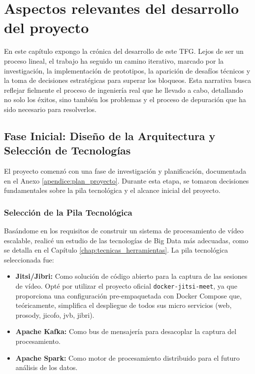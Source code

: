 \chapter{Aspectos relevantes del desarrollo del proyecto}
\label{chap:desarrollo}

En este capítulo expongo la crónica del desarrollo de este TFG. Lejos de ser un proceso lineal, el trabajo ha seguido un camino iterativo, marcado por la investigación, la implementación de prototipos, la aparición de desafíos técnicos y la toma de decisiones estratégicas para superar los bloqueos. Esta narrativa busca reflejar fielmente el proceso de ingeniería real que he llevado a cabo, detallando no solo los éxitos, sino también los problemas y el proceso de depuración que ha sido necesario para resolverlos.

\section{Fase Inicial: Diseño de la Arquitectura y Selección de Tecnologías}
El proyecto comenzó con una fase de investigación y planificación, documentada en el Anexo \ref{apendice:plan_proyecto}. Durante esta etapa, se tomaron decisiones fundamentales sobre la pila tecnológica y el alcance inicial del proyecto.

\subsection{Selección de la Pila Tecnológica}
Basándome en los requisitos de construir un sistema de procesamiento de vídeo escalable, realicé un estudio de las tecnologías de Big Data más adecuadas, como se detalla en el Capítulo \ref{chap:tecnicas_herramientas}. La pila tecnológica seleccionada fue:
\begin{itemize}
    \item \textbf{Jitsi/Jibri:} Como solución de código abierto para la captura de las sesiones de vídeo. Opté por utilizar el proyecto oficial \texttt{docker-jitsi-meet}, ya que proporciona una configuración pre-empaquetada con Docker Compose que, teóricamente, simplifica el despliegue de todos sus micro servicios (web, prosody, jicofo, jvb, jibri).
    \item \textbf{Apache Kafka:} Como bus de mensajería para desacoplar la captura del procesamiento.
    \item \textbf{Apache Spark:} Como motor de procesamiento distribuido para el futuro análisis de los datos.
\end{itemize}

